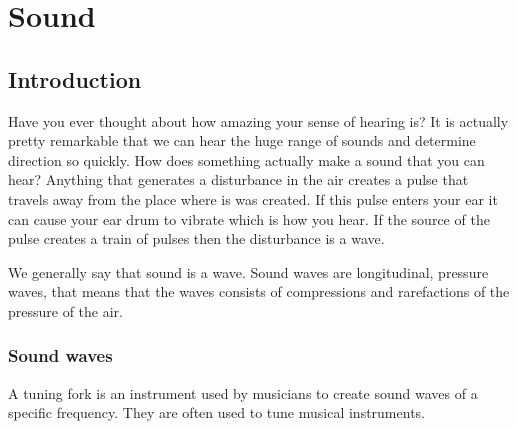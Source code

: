          \chapter{Sound}

    \setcounter{figure}{1}
    \setcounter{subfigure}{1}
    \label{9b5d72dd5f0585e544578ab90a9956a8}
         \section{Introduction}
    \nopagebreak
    \label{m38799*cid2}
\label{m38799*id183123}Have you ever thought about how amazing your sense of hearing is? It is actually pretty remarkable that we can hear the huge range of sounds and determine direction so quickly. How does something actually make a sound that you can hear? Anything that generates a disturbance in the air creates a pulse that travels away from the place where is was created. If this pulse enters your ear it can cause your ear drum to vibrate which is how you hear. If the source of the pulse creates a train of pulses then the disturbance is a wave.
           
We generally say that sound is a wave. Sound waves are longitudinal, pressure waves, that means that the waves consists of compressions and rarefactions of the pressure of the air.\par 

\subsection*{Sound waves}
            \nopagebreak
A tuning fork is an instrument used by musicians to create sound waves of a specific frequency. They are often used to tune musical instruments.

